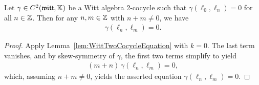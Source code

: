 \begin{lemma}
  \label{lem:WittTwoCocycleSupport}
  \leanok
  Let $\gamma \in C^2(\mathfrak{witt},\mathbb{K})$ be a Witt algebra 2-cocycle such that
  $\gamma (\ell_0 , \ell_n) = 0$ for all $n \in \mathbb{Z}$.
  Then for any $n,m \in \mathbb{Z}$ with $n+m \ne 0$, we have
  \begin{align*}
    \gamma(\ell_n , \ell_m) = 0.
  \end{align*}
\end{lemma}
\begin{proof}
  \leanok
  Apply Lemma~\ref{lem:WittTwoCocycleEquation} with $k=0$. The last term
  vanishes, and by skew-symmetry of $\gamma$, the first two terms simplify to yield
  \begin{align*}
    (m+n) \, \gamma (\ell_n , \ell_m) = 0 ,
  \end{align*}
  which, assuming $n+m \ne 0$, yields the asserted equation
  $\gamma (\ell_n , \ell_m) = 0$.
\end{proof}

